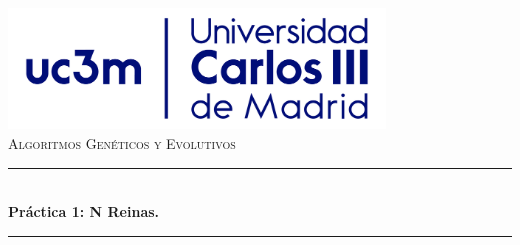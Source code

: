 \documentclass[12pt]{article}
\begin{document}
\begin{titlepage}

\newcommand{\HRule}{\rule{\linewidth}{0.5mm}} %

\center %




\includegraphics[width=100mm]{uc3m_logo}\\[1cm] %

\textsc{\Large Algoritmos Genéticos y Evolutivos}\\[0.5cm] %


\HRule \\[0.4cm]
{ \huge \bfseries Práctica 1: N Reinas.}\\[0.4cm] %
\HRule \\[2cm]

\vspace{6cm}


\end{titlepage}
\end{document}

